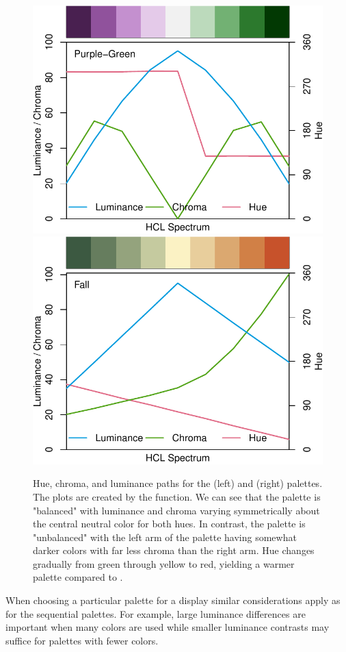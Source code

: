 \begin{figure}[ht!]

{\centering \includegraphics[width=0.49\linewidth]{color_files/figure-latex/purplegreen-fall-1} \includegraphics[width=0.49\linewidth]{color_files/figure-latex/purplegreen-fall-2} 

}

\caption{Hue, chroma, and luminance paths for the  (left) and  (right) palettes. The plots are created by the  function. We can see that the  palette is "balanced" with luminance and chroma varying symmetrically about the central neutral color for both hues. In contrast, the  palette is "unbalanced" with the left arm of the palette having somewhat darker colors with far less chroma than the right arm. Hue changes gradually from green through yellow to red, yielding a warmer palette compared to .}\label{fig:purplegreen-fall}
\end{figure}

When choosing a particular palette for a display similar
considerations apply as for the sequential palettes. For example,
large luminance differences are important when many colors are used
while smaller luminance contrasts may suffice for palettes with fewer
colors.


